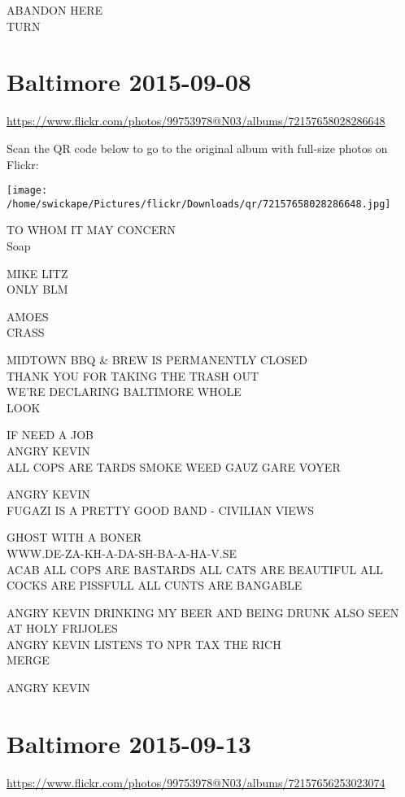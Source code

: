 \documentclass[10pt,letterpaper]{article}
\begin{document}
ABANDON HERE\\
TURN
\pagebreak

\section*{Baltimore 2015-09-08}

\url{https://www.flickr.com/photos/99753978@N03/albums/72157658028286648}

Scan the QR code below to go to the original album with full-size photos on Flickr:

\texttt{[image: /home/swickape/Pictures/flickr/Downloads/qr/72157658028286648.jpg]}
\pagebreak

TO WHOM IT MAY CONCERN\\
Soap

MIKE LITZ\\
ONLY BLM

AMOES\\
CRASS

MIDTOWN BBQ \& BREW IS PERMANENTLY CLOSED\\
THANK YOU FOR TAKING THE TRASH OUT\\
WE'RE DECLARING BALTIMORE WHOLE\\
LOOK

IF NEED A JOB\\
ANGRY KEVIN\\
ALL COPS ARE TARDS SMOKE WEED GAUZ GARE VOYER

ANGRY KEVIN\\
FUGAZI IS A PRETTY GOOD BAND {-} CIVILIAN VIEWS

GHOST WITH A BONER\\
WWW.DE{-}ZA{-}KH{-}A{-}DA{-}SH{-}BA{-}A{-}HA{-}V.SE\\
ACAB ALL COPS ARE BASTARDS ALL CATS ARE BEAUTIFUL ALL COCKS ARE PISSFULL ALL CUNTS ARE BANGABLE

ANGRY KEVIN DRINKING MY BEER AND BEING DRUNK ALSO SEEN AT HOLY FRIJOLES\\
ANGRY KEVIN LISTENS TO NPR TAX THE RICH\\
MERGE

ANGRY KEVIN
\pagebreak

\section*{Baltimore 2015-09-13}

\url{https://www.flickr.com/photos/99753978@N03/albums/72157656253023074}
\end{document}
